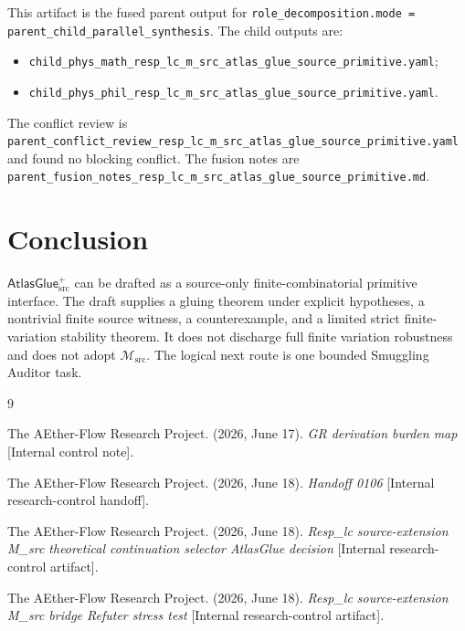 \documentclass[11pt]{article}
\newcommand{\Msrc}{\mathcal{M}_{\mathrm{src}}}
\newcommand{\AtlasGlue}{\mathsf{AtlasGlue}_{\mathrm{src}}^{+}}
\begin{document}
This artifact is the fused parent output for
\texttt{role\_decomposition.mode = parent\_child\_parallel\_synthesis}. The
child outputs are:
\begin{itemize}
  \item \texttt{child\_phys\_math\_resp\_lc\_m\_src\_atlas\_glue\_source\_primitive.yaml};
  \item \texttt{child\_phys\_phil\_resp\_lc\_m\_src\_atlas\_glue\_source\_primitive.yaml}.
\end{itemize}
The conflict review is
\texttt{parent\_conflict\_review\_resp\_lc\_m\_src\_atlas\_glue\_source\_primitive.yaml}
and found no blocking conflict. The fusion notes are
\texttt{parent\_fusion\_notes\_resp\_lc\_m\_src\_atlas\_glue\_source\_primitive.md}.

\section{Conclusion}

\(\AtlasGlue\) can be drafted as a source-only finite-combinatorial primitive
interface. The draft supplies a gluing theorem under explicit hypotheses, a
nontrivial finite source witness, a counterexample, and a limited strict
finite-variation stability theorem. It does not discharge full finite
variation robustness and does not adopt \(\Msrc\). The logical next route is
one bounded Smuggling Auditor task.

\begin{thebibliography}{9}

The AEther-Flow Research Project. (2026, June 17). \emph{GR derivation burden
map} [Internal control note].

The AEther-Flow Research Project. (2026, June 18). \emph{Handoff 0106}
[Internal research-control handoff].

The AEther-Flow Research Project. (2026, June 18). \emph{Resp\_lc
source-extension M\_src theoretical continuation selector AtlasGlue decision}
[Internal research-control artifact].

The AEther-Flow Research Project. (2026, June 18). \emph{Resp\_lc
source-extension M\_src bridge Refuter stress test} [Internal
research-control artifact].

\end{thebibliography}
\end{document}

